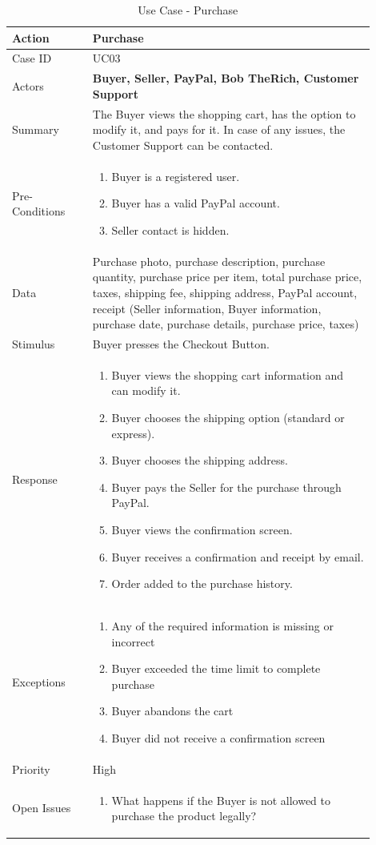 \documentclass[11pt]{article}
\newcounter{use case ID}
\newcommand\tabularhead[1]{
    \begin{table}[ht]
        \addtocounter{use case ID}{1}
        \caption{Use Case \arabic{use case ID} - #1}
        \vspace{0.2cm}
        \begin{tabular}{|p{0.2\linewidth}|p{0.70\linewidth}|}
            \hline
            \textbf{Action} & \textbf{#1} \\
            \hline}
\newcommand\addrow[2]{#1 & #2\\ \hline}
\newcommand\addmulrow[2]{ \begin{minipage}[t][][t]{2.5cm}#1\end{minipage}
                &\begin{minipage}[t][][t]{11cm}
                    \begin{enumerate}[itemsep=-1ex] #2   \end{enumerate}
                \end{minipage}\vfill\\ \hline}
\newenvironment{usecase}{\tabularhead}
        {\hline\end{tabular}\end{table}}
\newcounter{req ID}
\begin{document}
\begin{usecase}{Purchase}
    \addrow{Case ID}{UC03}
    \addrow{Actors}{\textbf{Buyer, Seller, PayPal, Bob TheRich, Customer Support}}
    \addrow{Summary}{The Buyer views the shopping cart, has the option to modify it, and pays for it. In case of any issues, the Customer Support can be contacted.}
    \addmulrow{Pre-Conditions}{
        \item \index{buyer}Buyer is a \index{registered user}registered user.
        \item Buyer has a valid \index{PayPal}PayPal account.
        \item \index{seller}Seller contact is hidden.
    }
    \addrow{\index{data}Data}{Purchase photo, purchase description, purchase quantity, purchase price per item, total purchase price, taxes, shipping fee, shipping address, PayPal account, \index{receipt}receipt (Seller \index{information}information, Buyer information, purchase date, purchase details, purchase price, taxes)}
    \addrow{Stimulus}{Buyer presses the Checkout Button.}
    \addmulrow{Response}{
            \item \index{buyer}Buyer views the shopping cart information and can modify it.
            \item Buyer chooses the shipping option (standard or express).
            \item Buyer chooses the shipping address.
            \item Buyer pays the \index{seller}Seller for the purchase through \index{PayPal}PayPal.
            \item Buyer views the confirmation screen.
            \item Buyer receives a confirmation and \index{receipt}receipt by email.
            \item Order added to the purchase history.
    }
    \addmulrow{Exceptions}{
        \item Any of the required \index{information}information is missing or incorrect
        \item \index{buyer}Buyer exceeded the time limit to complete purchase
        \item Buyer abandons the cart
        \item Buyer did not receive a confirmation screen
    }
    \addrow{Priority}{High}
    \addmulrow{Open Issues}{
        \item What happens if the \index{buyer}Buyer is not allowed to purchase the \index{product}product legally?
    }

\end{usecase}
\end{document}
